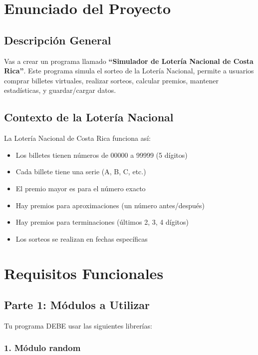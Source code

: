 \documentclass[12pt,a4paper]{article}
\begin{document}
\section{Enunciado del Proyecto}

\subsection{Descripción General}

Vas a crear un programa llamado \textbf{``Simulador de Lotería Nacional de Costa Rica''}. Este programa simula el sorteo de la Lotería Nacional, permite a usuarios comprar billetes virtuales, realizar sorteos, calcular premios, mantener estadísticas, y guardar/cargar datos.

\subsection{Contexto de la Lotería Nacional}

La Lotería Nacional de Costa Rica funciona así:
\begin{itemize}
    \item Los billetes tienen números de 00000 a 99999 (5 dígitos)
    \item Cada billete tiene una serie (A, B, C, etc.)
    \item El premio mayor es para el número exacto
    \item Hay premios para aproximaciones (un número antes/después)
    \item Hay premios para terminaciones (últimos 2, 3, 4 dígitos)
    \item Los sorteos se realizan en fechas específicas
\end{itemize}

\section{Requisitos Funcionales}

\subsection{Parte 1: Módulos a Utilizar}

Tu programa DEBE usar las siguientes librerías:

\subsubsection{1. Módulo random}
\end{document}
